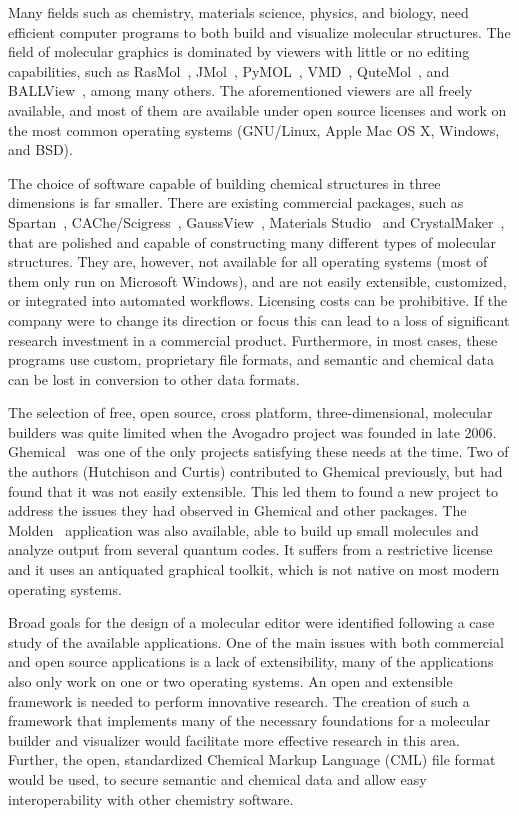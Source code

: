 \documentclass[10pt]{bmc_article}
\newenvironment{bmcformat}{\begin{raggedright}
\baselineskip20pt\sloppy\setboolean{publ}{false}}{\end{raggedright}
\baselineskip20pt\sloppy}
\begin{document}
\begin{bmcformat}
Many fields such as chemistry, materials science, physics, and biology, need
efficient computer programs to both build and visualize molecular structures.
The field of molecular graphics is dominated by viewers with little or no
editing capabilities, such as RasMol~\cite{RasMol}, JMol~\cite{JMol},
PyMOL~\cite{PyMOL}, VMD~\cite{VMD}, QuteMol~\cite{QuteMol}, and
BALLView~\cite{BALLView}, among many others. The aforementioned viewers are all
freely available, and most of them are available under open source licenses and
work on the most common operating systems (GNU/Linux, Apple Mac OS X, Windows,
and BSD).

The choice of software capable of building chemical structures in
three dimensions is far smaller.
There are existing commercial packages, such as
Spartan~\cite{Spartan}, CAChe/Scigress~\cite{CAChe},
GaussView~\cite{GaussView}, Materials Studio~\cite{Accelrys} and
CrystalMaker~\cite{CrystalMaker}, that are polished and capable of
constructing many different types of molecular structures. They are,
however, not available for all operating systems (most of them only
run on Microsoft Windows), and are not easily extensible, customized,
or integrated into automated workflows. Licensing costs can be
prohibitive. If the company were to change its direction or focus this
can lead to a loss of significant research investment in a commercial
product. Furthermore, in most cases, these programs use custom,
proprietary file formats, and semantic and chemical data can be lost in
conversion to other data formats.

The selection of free, open source, cross platform, three-dimensional,
molecular builders was quite limited when the Avogadro project was founded in late 2006.
Ghemical~\cite{Ghemical} was one of the only projects satisfying these needs at
the time. Two of the authors (Hutchison and Curtis) contributed to Ghemical
previously, but had found that it was not easily extensible. This led them to
found a new project to address the issues they had observed in Ghemical
and other packages. The Molden~\cite{Molden} application was also available,
able to build up small molecules and analyze output from several quantum codes.
It suffers from a restrictive license and it uses an antiquated graphical
toolkit, which is not native on most modern operating systems.

Broad goals for the design of a molecular editor were identified following a
case study of the available applications. One of the main issues with both
commercial and open source applications is a lack of extensibility, many of the
applications also only work on one or two operating systems. An open and
extensible framework is needed to perform innovative research. The
creation of such a framework that implements many of the necessary foundations
for a molecular builder and visualizer would facilitate more effective research
in this area. Further, the open, standardized Chemical Markup Language
(CML) file format~\cite{CML2011a, CML2011b} would be used, to secure
semantic and chemical data and allow easy interoperability with other
chemistry software.


\end{bmcformat}
\end{document}
